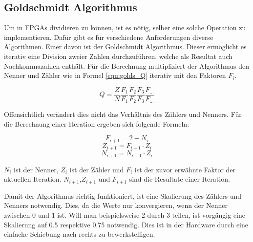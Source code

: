 
\subsection{Goldschmidt Algorithmus}\label{subsec:Goldschmidt}

Um in FPGAs dividieren zu können, ist es nötig, selber eine solche Operation zu implementieren. Dafür gibt es für verschiedene Anforderungen diverse Algorithmen. Einer davon ist der Goldschmidt Algorithmus. Dieser ermöglicht es iterativ eine Division zweier Zahlen durchzuführen, welche als Resultat auch Nachkommazahlen enthält. Für die Berechnung multipliziert der Algorithmus den Nenner und Zähler wie in Formel \ref{equ:golds_Q} iterativ mit den Faktoren \(F_i\).

\begin{equation}
Q = \frac{Z}{N}\frac{F_1}{F_1}\frac{F_2}{F_2}\frac{F_3}{F_3}\frac{F_{...}}{F_{...}}
\label{equ:golds_Q}
\end{equation}

Offensichtlich verändert dies nicht das Verhältnis des Zählers und Nenners. Für die Berechnung einer Iteration ergeben sich folgende Formeln:

\begin{equation}
F_{i+1} = 2 - N_i
\label{equ:golds_Fi+1}
\end{equation}
\begin{equation}
Z_{i+1} = F_{i+1}\cdot Z_i
\label{equ:golds_Zi+1}
\end{equation}
\begin{equation}
N_{i+1} = N_{i+1}\cdot Z_i
\label{equ:golds_Ni+1}
\end{equation}

\(N_i\) ist der Nenner, \(Z_i\) ist der Zähler und \(F_i\) ist der zuvor erwähnte Faktor der aktuellen Iteration. \(N_{i+1}\),\(Z_{i+1}\) und \(F_{i+1}\) sind die Resultate einer Iteration.

Damit der Algorithmus richtig funktioniert, ist eine Skalierung des Zählers und Nenners notwendig. Dies, da die Werte nur konvergieren, wenn der Nenner zwischen 0 und 1 ist. Will man beispielsweise 2 durch 3 teilen, ist vorgängig eine Skalierung auf 0.5 respektive 0.75 notwendig. Dies ist in der Hardware durch eine einfache Schiebung nach rechts zu bewerkstelligen.